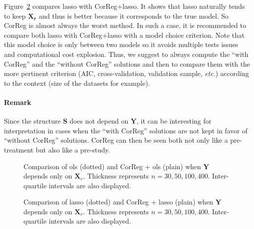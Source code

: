 \documentclass[11pt,a4paper]{article}
\begin{document}
Figure~\ref{X2LASSO} compares {\sc lasso} with {\sc CorReg}+{\sc lasso}. It shows that {\sc lasso} naturally tends to keep $\boldsymbol{X_r}$ and thus is better because it corresponds to the true model. So {\sc CorReg} is almost always the worst method. In such a case, it is recommended to compare both {\sc lasso} with {\sc CorReg}+{\sc lasso} with a model choice criterion. Note that this model choice is only between two models so it avoids multiple tests issues and computational cost explosion. Thus, we suggest to always compute the ``with {\sc CorReg}'' and the ``without {\sc CorReg}'' solutions and then to compare them with the more pertinent criterion ({\sc AIC}, cross-validation, validation sample, {\it etc.}) according to the context (size of the datasets for example).

\paragraph{Remark}
Since the structure $\boldsymbol{S}$ does not depend on $\boldsymbol{Y}$, it can be interesting for interpretation in cases when the ``with {\sc CorReg}'' solutions are not kept in favor of ``without {\sc CorReg}'' solutions. {\sc CorReg} can then be seen both not only like a pre-treatment but also like a pre-study.


\begin{figure}[h!]
	 \quad
	\caption{Comparison of {\sc ols} (dotted) and {\sc CorReg} + {\sc ols} (plain) when $\boldsymbol{Y}$ depends only on $\boldsymbol{X}_r$. Thickness represents $n=30,50,100,400$.  Inter-quartile intervals are also displayed.}\label{X2OLS}
\end{figure}
 


\begin{figure}[h!]
	 \quad
	\caption{Comparison of {\sc lasso} (dotted) and {\sc CorReg} + {\sc lasso} (plain) when $\boldsymbol{Y}$ depends only on $\boldsymbol{X}_r$. Thickness represents $n=30,50,100,400$.  Inter-quartile intervals are also displayed.}\label{X2LASSO}
\end{figure}
\end{document}
